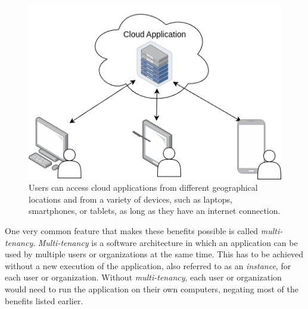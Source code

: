 \begin{figure}[t]
	\centering
	\includegraphics[scale=0.45]{images/basic-cloud-services.drawio.png}
	\caption{Users can access cloud applications from different geographical locations and from a variety of devices, such as laptops, smartphones, or tablets, as long as they have an internet connection.}
	\label{fig:cloud-applications}
	\vspace{-2em} %
\end{figure}
\FloatBarrier
%

One very common feature that makes these benefits possible is called \textit{multi-tenancy}.
\textit{Multi-tenancy} is a software architecture in which an application
can be used by multiple users or organizations at the same time.
This has to be achieved without a new execution
of the application, also referred to as an \textit{instance}, for each user or organization.
Without \textit{multi-tenancy}, each user or organization would need to run the application on
their own computers,
negating most of the benefits listed earlier.

